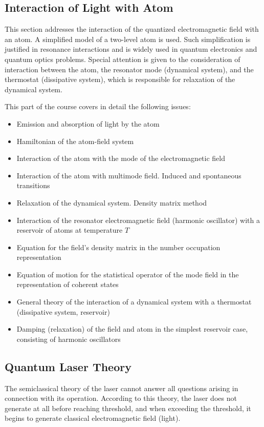 \subsection{Interaction of Light with Atom}
This section addresses the interaction of the quantized electromagnetic
field with an atom. A simplified model of a two-level atom is used.
Such simplification is justified in resonance interactions and is widely
used in quantum electronics and quantum optics problems. Special attention
is given to the consideration of interaction between the atom, the resonator mode
(dynamical system), and the thermostat (dissipative system),
which is responsible for relaxation of the dynamical system.

This part of the course covers in detail the following issues:
\begin{itemize}
\item Emission and absorption of light by the atom
\item Hamiltonian of the atom-field system
\item Interaction of the atom with the mode of the electromagnetic field
\item Interaction of the atom with multimode field. Induced and spontaneous transitions
\item Relaxation of the dynamical system. Density matrix method
\item Interaction of the resonator electromagnetic field (harmonic oscillator)
  with a reservoir of atoms at temperature \(T\)
\item Equation for the field's density matrix in the number occupation representation
\item Equation of motion for the statistical operator of the mode field in
  the representation of coherent states
\item General theory of the interaction of a dynamical system with
  a thermostat (dissipative system, reservoir)
\item Damping (relaxation) of the field and atom in the simplest reservoir case,
  consisting of harmonic oscillators
\end{itemize}

\subsection{Quantum Laser Theory}
The semiclassical theory of the laser cannot answer all questions
arising in connection with its operation. According to this theory,
the laser does not generate at all before reaching threshold, and when
exceeding the threshold, it begins to generate classical electromagnetic field (light).

